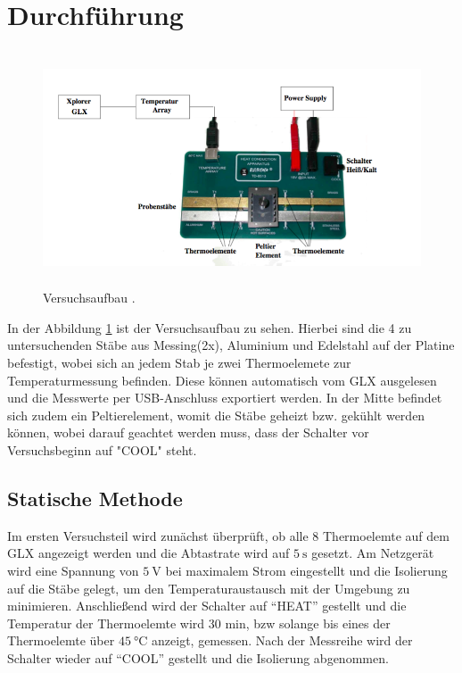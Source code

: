 \section{Durchführung}
\begin{figure}[H]
  \centering
  \includegraphics[height=7cm]{Aufbau.png}
  \caption{Versuchsaufbau \cite{skript}.}
  \label{fig:aufbau}
\end{figure}
In der Abbildung \ref{fig:aufbau} ist der Versuchsaufbau zu sehen. Hierbei sind die
4 zu untersuchenden Stäbe aus Messing(2x), Aluminium und Edelstahl auf der Platine befestigt,
wobei sich an jedem Stab je zwei Thermoelemete zur Temperaturmessung befinden. Diese
können automatisch vom GLX ausgelesen und die Messwerte per USB-Anschluss exportiert
werden.
In der Mitte befindet sich zudem ein Peltierelement, womit die Stäbe geheizt bzw. gekühlt
werden können, wobei darauf geachtet werden muss, dass der Schalter vor Versuchsbeginn auf
"COOL" steht.

\subsection{Statische Methode}
Im ersten Versuchsteil wird zunächst überprüft, ob alle 8 Thermoelemte auf dem GLX
angezeigt werden und die Abtastrate wird auf $\SI{5}{\second}$ gesetzt. Am Netzgerät wird eine Spannung
von $\SI{5}{\volt}$ bei maximalem Strom eingestellt und die Isolierung auf die Stäbe gelegt, um
den Temperaturaustausch mit der Umgebung zu minimieren. Anschließend wird der Schalter
auf “HEAT” gestellt und die Temperatur der Thermoelemte wird 30 min, bzw solange bis
eines der Thermoelemte über $\SI{45}{\celsius}$ anzeigt, gemessen. Nach der Messreihe
wird der Schalter wieder auf “COOL” gestellt und die Isolierung abgenommen.


